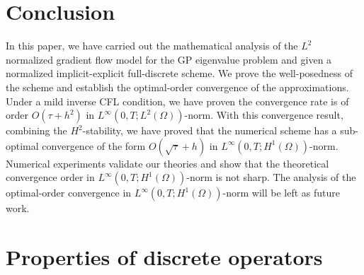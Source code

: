 \documentclass{siamart250211}
\begin{document}
\section{Conclusion}\label{sec: conclusion}

In this paper, we have carried out the mathematical analysis of the $L^2$ normalized gradient flow model for the GP eigenvalue problem and given a normalized implicit-explicit full-discrete scheme. We prove the well-posedness of the scheme and establish the optimal-order convergence of the approximations. Under a mild inverse CFL condition, we have proven the convergence rate is of order $O(\tau + h^2)$ in $L^{\infty}(0,T;L^2(\Omega))$-norm. With this convergence result, combining the $H^2$-stability, we have proved that the numerical scheme has a sub-optimal convergence of the form $O(\sqrt{\tau} + h)$ in $L^{\infty}(0,T;H^1(\Omega))$-norm. Numerical experiments validate our theories and show that the theoretical convergence order in $L^{\infty}(0,T;H^1(\Omega))$-norm is not sharp. The analysis of the optimal-order convergence in $L^{\infty}(0,T;H^1(\Omega))$-norm will be left as future work.

\appendix

\section{Properties of discrete operators}
\end{document}
